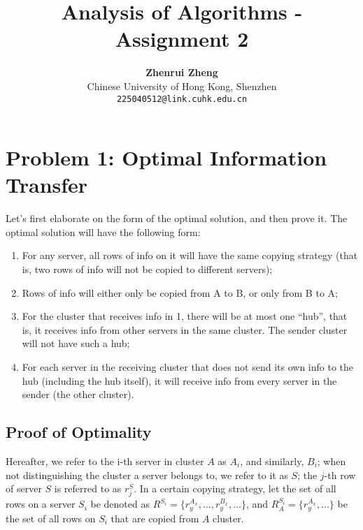 \documentclass[11pt, a4paper, oneside]{memoir}
\title{\huge\textbf{Analysis of Algorithms - Assignment 2}\vspace{-0.5cm}}
\author{\textbf{Zhenrui Zheng} \vspace{0.5cm} \\ \small Chinese University of Hong Kong, Shenzhen \\ \small\texttt{225040512@link.cuhk.edu.cn}}
\date{}
\begin{document}
\begin{titlingpage}
\maketitle
\renewcommand{\contentsname}{\huge Contents \vspace{-1cm}}
\begin{KeepFromToc} %
\tableofcontents
\end{KeepFromToc}
\end{titlingpage}

\chapter{Problem 1: Optimal Information Transfer}
Let's first elaborate on the form of the optimal solution, and then prove it.
The optimal solution will have the following form:
\begin{enumerate}
  \item For any server, all rows of info on it will have the same copying strategy
  (that is, two rows of info will not be copied to different servers);
  \item Rows of info will either only be copied from A to B, or only from B to A;
  \item For the cluster that receives info in 1, there will be at most one ``hub'',
  that is, it receives info from other servers in the same cluster. The sender cluster will not have such a hub;
  \item For each server in the receiving cluster that does not send its own info to the hub (including the hub itself),
  it will receive info from every server in the sender (the other cluster).
\end{enumerate}

\section{Proof of Optimality}
Hereafter, we refer to the i-th server in cluster $A$ as $A_i$, and similarly, $B_i$;
when not distinguishing the cluster a server belongs to, we refer to it as $S$;
the $j$-th row of server $S$ is referred to as $r^S_j$. In a certain copying strategy,
let the set of all rows on a server $S_i$ be denoted as $R^{S_i}=\{r^{A_x}_y, ..., r^{B_x}_y, ...\}$,
and $R^{S_i}_A=\{r^{A_x}_y,...\}$ be the set of all rows on $S_i$ that are copied from $A$ cluster.
\end{document}

